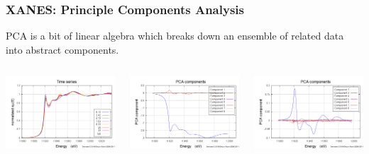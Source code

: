 \documentclass[10pt, xcolor=x11names, compress]{beamer}
\begin{document}
\begin{frame}
  \frametitle{XANES: Principle Components Analysis}
  \small%
  PCA is a bit of linear algebra which breaks down an ensemble of
  related data into abstract components.
  \begin{columns}[T]
    \begin{column}{0.33\linewidth}
      \includegraphics[width=\linewidth]{images/aucyano_time_series.png}
    \end{column}
    \begin{column}{0.33\linewidth}
      \includegraphics[width=\linewidth]{images/pca_all.png}      
    \end{column}
    \begin{column}{0.33\linewidth}
      \includegraphics[width=\linewidth]{images/pca_2-8.png}            

\end{column}
\end{columns}
\end{frame}
\end{document}
